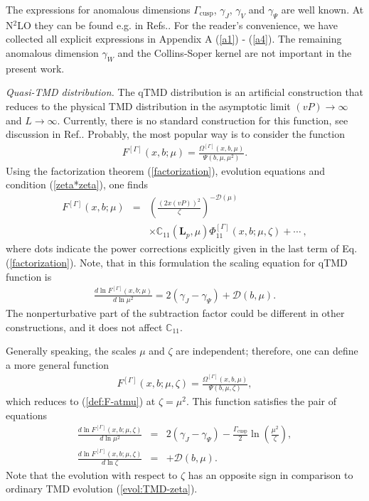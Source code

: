 \documentclass[aps,prl,twocolumn,secnumarabic,notitlepage,superscriptaddress,nofootinbib,tightenlines,floatfix,preprintnumbers]{revtex4-1}
\newcommand{\nn}{\nonumber}
\renewcommand{\(}{\left(}
\renewcommand{\)}{\right)}
\renewcommand{\[}{\left[}
\renewcommand{\]}{\right]}
\begin{document}
The expressions for anomalous dimensions $\Gamma_{\text{cusp}}$, $\gamma_J$, $\gamma_V$ and $\gamma_\Psi$ are well known. At N$^2$LO they can be found e.g. in Refs.\cite{Braun:2020ymy, Echevarria:2016scs, Bruser:2019yjk}. For the reader's convenience, we have collected all explicit expressions in Appendix A (\ref{a1}) - (\ref{a4}). The remaining anomalous dimension $\gamma_W$ and the Collins-Soper kernel are not important in the present work.

\textit{Quasi-TMD distribution.} The qTMD distribution is an artificial construction that reduces to the physical TMD distribution in the asymptotic limit $(vP)\to\infty$ and $L\to \infty$. Currently, there is no standard construction for this function, see discussion in Ref.\cite{Ebert:2022fmh}. Probably, the most popular way \cite{Ebert:2018gzl, Ebert:2019tvc, Ebert:2020gxr, Ji:2019ewn, Rodini:2022wic} is to consider the function
\begin{eqnarray}\label{def:F-atmu}
F^{[\Gamma]}(x,b;\mu)=\frac{ \Omega^{[\Gamma]}(x,b,\mu)}{\Psi(b,\mu,\mu^2)}.
\end{eqnarray}
Using the factorization theorem (\ref{factorization}), evolution equations and condition (\ref{zeta*zeta}), one finds 
\begin{eqnarray}
F^{[\Gamma]}(x,b;\mu)&=&
\(\frac{(2x(vP))^2}{\zeta}\)^{-\mathcal{D}(\mu)}
\\\nn 
&&
\times \mathbb{C}_{11}(\mathbf{L}_p,\mu)\Phi_{11}^{[\Gamma]}(x,b;\mu,\zeta)+\cdots~,
\end{eqnarray}
where dots indicate the power corrections explicitly given in the last term of Eq.(\ref{factorization}). Note, that in this formulation the scaling equation for qTMD function is
\begin{eqnarray}
\frac{d \ln F^{[\Gamma]}(x,b;\mu)}{d \ln \mu^2}=2(\gamma_J-\gamma_\Psi)
+\mathcal{D}(b,\mu).
\end{eqnarray}
The nonperturbative part of the subtraction factor could be different in other constructions, and it does not affect $\mathbb{C}_{11}$.

Generally speaking, the scales $\mu$ and $\zeta$ are independent; therefore, one can define a more general function
\begin{eqnarray}\label{def:F-atmuzeta}
F^{[\Gamma]}(x,b;\mu,\zeta)=\frac{ \Omega^{[\Gamma]}(x,b,\mu)}{\Psi(b,\mu,\zeta)},
\end{eqnarray}
which reduces to (\ref{def:F-atmu}) at $\zeta=\mu^2$. This function satisfies the pair of equations
\begin{eqnarray}
\frac{d \ln F^{[\Gamma]}(x,b;\mu,\zeta)}{d \ln \mu^2}&=&2(\gamma_J-\gamma_\Psi)
-\frac{\Gamma_{\text{cusp}}}{2}\ln\(\frac{\mu^2}{\zeta}\),
\\
\frac{d \ln F^{[\Gamma]}(x,b;\mu,\zeta)}{d \ln \zeta}&=&+\mathcal{D}(b,\mu).
\end{eqnarray}
Note that the evolution with respect to $\zeta$ has an opposite sign in comparison to ordinary TMD evolution (\ref{evol:TMD-zeta}).
\end{document}
